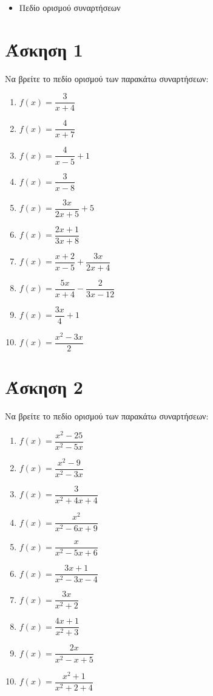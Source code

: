 \documentclass[a4paper,10pt]{report}
\begin{document}
\vspace{2em}
\begin{itemize}
\item Πεδίο ορισμού συναρτήσεων
\end{itemize}

\section*{Άσκηση 1  \hfill \small{}}
Να βρείτε το πεδίο ορισμού των παρακάτω συναρτήσεων:
\begin{enumerate}[1)]
 \item $f(x)=\dfrac{3}{x+4}$
 \item $f(x)=\dfrac{4}{x+7}$
 \item $f(x)=\dfrac{4}{x-5}+1$
 \item $f(x)=\dfrac{3}{x-8}$
 \item $f(x)=\dfrac{3x}{2x+5}+5$
 \item $f(x)=\dfrac{2x+1}{3x+8}$   
 \item $f(x)=\dfrac{x+2}{x-5}+\dfrac{3x}{2x+4}$
 \item $f(x)=\dfrac{5x}{x+4}-\dfrac{2}{3x-12}$ 
 \item $f(x)=\dfrac{3x}{4}+1$
 \item $f(x)=\dfrac{x^{2}-3x}{2}$  
\end{enumerate}


\section*{Άσκηση 2  \hfill \small{}}
Να βρείτε το πεδίο ορισμού των παρακάτω συναρτήσεων:
\begin{enumerate}[1)]
 \item $f(x)=\dfrac{x^{2}-25}{x^{2}-5x}$
 \item $f(x)=\dfrac{x^{2}-9}{x^{2}-3x}$
 \item $f(x)=\dfrac{3}{x^{2}+4x+4}$
 \item $f(x)=\dfrac{x^{2}}{x^{2}-6x+9}$
 \item $f(x)=\dfrac{x}{x^{2}-5x+6}$
 \item $f(x)=\dfrac{3x+1}{x^{2}-3x-4}$
 \item $f(x)=\dfrac{3x}{x^{2}+2}$
 \item $f(x)=\dfrac{4x+1}{x^{2}+3}$
 \item $f(x)=\dfrac{2x}{x^{2}-x+5}$
 \item $f(x)=\dfrac{x^{2}+1}{x^{2}+2+4}$
\end{enumerate}
\end{document}
